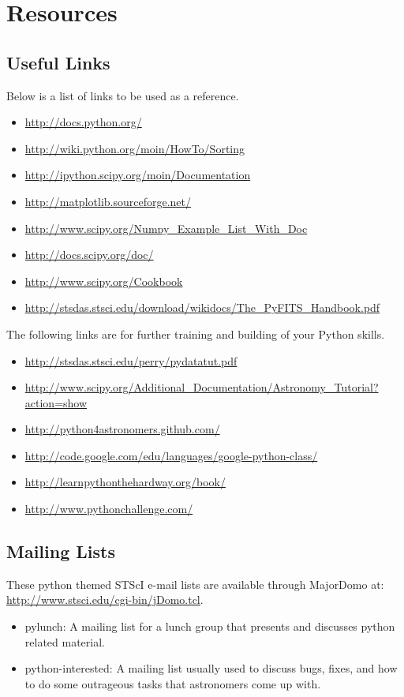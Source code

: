 \chapter{Resources}
\label{ch:links}
 
\section{Useful Links }
Below is a list of links to be used as a reference.
\begin{itemize}
\item \url{http://docs.python.org/}
\item \url{http://wiki.python.org/moin/HowTo/Sorting}
\item \url{http://ipython.scipy.org/moin/Documentation}
\item \url{http://matplotlib.sourceforge.net/}
\item \url{http://www.scipy.org/Numpy\_Example\_List\_With\_Doc}
\item \url{http://docs.scipy.org/doc/}
\item \url{http://www.scipy.org/Cookbook}
\item \url{http://stsdas.stsci.edu/download/wikidocs/The\_PyFITS\_Handbook.pdf}
\end{itemize}

The following links are for further training and building of your
Python skills.
\begin{itemize}
\item \url{http://stsdas.stsci.edu/perry/pydatatut.pdf}
\item \url{http://www.scipy.org/Additional_Documentation/Astronomy_Tutorial?action=show}
\item \url{http://python4astronomers.github.com/} 
\item \url{http://code.google.com/edu/languages/google-python-class/}
\item \url{http://learnpythonthehardway.org/book/}
\item \url{http://www.pythonchallenge.com/}
\end{itemize}

\section{Mailing Lists}
These python themed STScI e-mail lists are available through MajorDomo
at: \\
\url{http://www.stsci.edu/cgi-bin/jDomo.tcl}.  
\begin{itemize}
\item pylunch: A mailing list for a lunch group that presents and
  discusses python related material.
\item python-interested: A mailing list usually used to discuss bugs,
  fixes, and how to do some outrageous tasks that astronomers come up
  with.
\end{itemize}